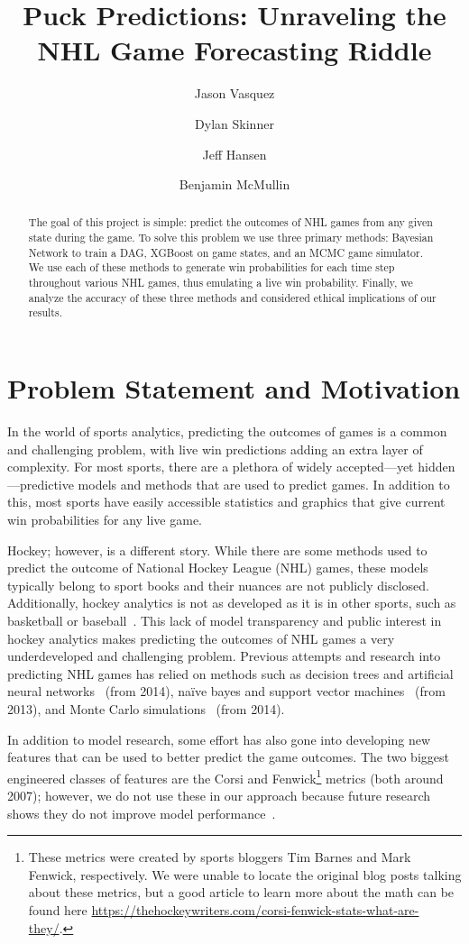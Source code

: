 \documentclass[11pt]{article}
\title{Puck Predictions: Unraveling the NHL Game Forecasting Riddle}
\author{Jason Vasquez \and Dylan Skinner \and Jeff Hansen \and Benjamin McMullin}
\begin{document}
\maketitle

\begin{abstract}
    The goal of this project is simple: predict the outcomes of NHL games from any given state during the game. To solve this problem we use three primary methods: Bayesian Network to train a DAG, XGBoost on game states, and an MCMC game simulator. We use each of these methods to generate win probabilities for each time step throughout various NHL games, thus emulating a live win probability. Finally, we analyze the accuracy of these three methods and considered ethical implications of our results.
\end{abstract}

\section{Problem Statement and Motivation}
In the world of sports analytics, predicting the outcomes of games is a common and challenging problem, with live win predictions adding
an extra layer of complexity. For most sports, there are a plethora of widely accepted—yet hidden—predictive models and methods that are used to
predict games. In addition to this, most sports have easily accessible statistics and graphics that give current win probabilities for any live game.

Hockey; however, is a different story. While there are some methods used to predict the outcome of National Hockey League (NHL) games, these models
typically belong to sport books and their nuances are not publicly disclosed. Additionally, hockey analytics is not as
developed as it is in other sports, such as basketball or baseball~\cite{Brooks-Davis}. This lack of model transparency and public interest in hockey analytics
makes predicting the outcomes of NHL games a very underdeveloped and challenging problem. Previous attempts and research into predicting NHL games
has relied on methods such as decision trees and artificial neural networks~\cite{pishcedda} (from 2014), naïve bayes and support vector machines~\cite{weissbock2013use} (from 2013),
and Monte Carlo simulations~\cite{Weissbock2014ForecastingSI} (from 2014).

In addition to model research, some effort has also gone into developing new features that can be used to better predict the game outcomes. 
The two biggest engineered classes of features are the Corsi
 and Fenwick\footnote{These metrics were created by sports bloggers Tim Barnes and Mark Fenwick, respectively. 
 We were unable to locate the original blog posts talking about these metrics, but a good article to learn more about the math can be
 found here \url{https://thehockeywriters.com/corsi-fenwick-stats-what-are-they/}.} metrics (both around 2007); however, we do not use these
 in our approach because future research shows they do not improve model performance~\cite{rinkstats_corsi_fenwick}.
\end{document}
